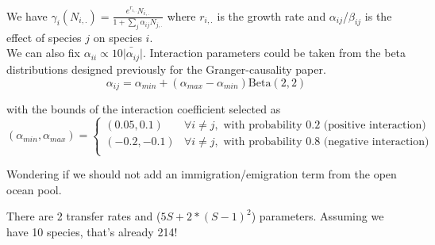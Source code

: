 \documentclass[a4paper,10pt]{article}
\begin{document}
 We have $\gamma_i(N_{i,.})=\frac{e^{r_{i,.}}N_{i,.}}{1+\sum_j\alpha_{ij}N_{j,.}}$ where $r_{i,.}$ is the growth rate and $\alpha_{ij}$/$\beta_{ij}$ is the effect of species $j$ on species $i$. \\
 
 We can also fix $\alpha_{ii}\propto10\bar{|\alpha_{ij}}|$. Interaction parameters could be taken from the beta distributions designed previously for the Granger-causality paper.
 \begin{equation}
\alpha_{ij}=\alpha_{min}+(\alpha_{max}-\alpha_{min})\text{Beta}(2,2)\label{eq:coef}
\end{equation}

with the bounds of the interaction coefficient selected as\\

\begin{equation}
(\alpha_{min},\alpha_{max})=\begin{cases}
(0.05,0.1) & \forall i\neq j,\text{ with probability 0.2 (positive interaction)}\\
(-0.2,-0.1) & \forall i\neq j,\text{ with probability 0.8 (negative interaction)}\\
\end{cases}\label{eq:coef_condition}
\end{equation}

 
 Wondering if we should not add an immigration/emigration term from the open ocean pool.
 
 
 There are 2 transfer rates and ($5S + 2*(S-1)^2$) parameters. Assuming we have 10 species, that's already 214!
   
\end{document}
